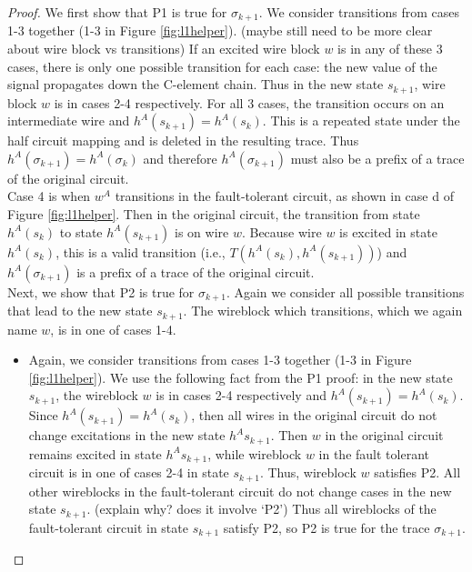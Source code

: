 \documentclass[12pt]{report}
\begin{document}
\begin{proof}
We first show that P1 is true for $\sigma_{k+1}$.  We consider transitions from cases 1-3 together (1-3 in Figure \ref{fig:l1helper}). (maybe still need to be more clear about wire block vs transitions) 
If an excited wire block $w$ is in any of these 3 cases, there is only one possible transition for each case: the new value of the signal propagates down the C-element chain.  Thus in the new state $s_{k+1}$, wire block $w$ is in cases 2-4 respectively.  For all 3 cases, the transition occurs on an intermediate wire and $h^A(s_{k+1})=h^A(s_{k})$.  This is a repeated state under the half circuit mapping and is deleted in the resulting trace.  Thus $h^{A}(\sigma_{k+1})=h^{A}(\sigma_k)$ and therefore $h^{A}(\sigma_{k+1})$ must also be a prefix of a trace of the original circuit. \\
Case 4 is when $w^A$ transitions in the fault-tolerant circuit, as shown in case d of Figure \ref{fig:l1helper}.  Then in the original circuit, the transition from state $h^A(s_k)$ to state $h^A(s_{k+1})$ is on wire $w$.  Because wire $w$ is excited in state $h^A(s_k)$, this is a valid transition (i.e., $T(h^A(s_k), h^A(s_{k+1}))$) and $h^{A}(\sigma_{k+1})$ is a prefix of a trace of the original circuit. \\

Next, we show that P2 is true for $\sigma_{k+1}$.  Again we consider all possible transitions that lead to the new state $s_{k+1}$.  The wireblock which transitions, which we again name $w$, is in one of cases 1-4.  

\begin{itemize}
\item Again, we consider transitions from cases 1-3 together (1-3 in Figure \ref{fig:l1helper}).  We use the following fact from the P1 proof: in the new state $s_{k+1}$, the wireblock $w$ is in cases 2-4 respectively and $h^A(s_{k+1})=h^A(s_{k})$.  Since $h^A(s_{k+1})=h^A(s_{k})$, then all wires in the original circuit do not change excitations in the new state $h^A{s_{k+1}}$.  Then $w$ in the original circuit remains excited in state $h^A{s_{k+1}}$, while wireblock $w$ in the fault tolerant circuit is in one of cases 2-4 in state $s_{k+1}$.  Thus, wireblock $w$ satisfies P2.  All other wireblocks in the fault-tolerant circuit do not change cases in the new state $s_{k+1}$.  (explain why? does it involve `P2')  
Thus all wireblocks of the fault-tolerant circuit in state $s_{k+1}$ satisfy P2, so P2 is true for the trace $\sigma_{k+1}$.     



\end{itemize}
\end{proof}
\end{document}
